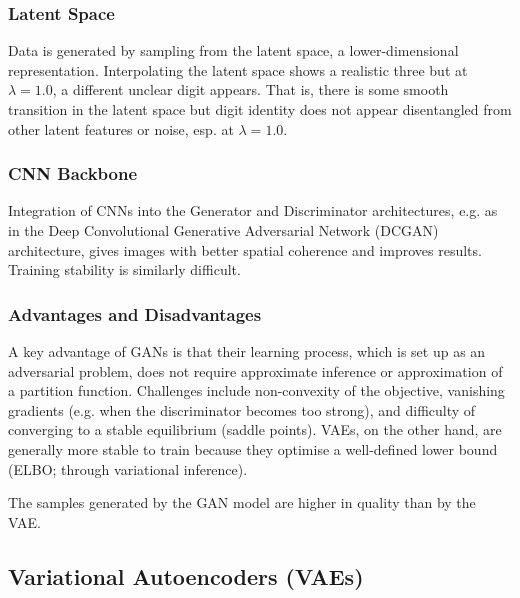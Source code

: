\vspace{-5pt}
\subsubsection{Latent Space}
\vspace{-5pt}

Data is generated by sampling from the latent space, a lower-dimensional representation.
Interpolating the latent space shows a realistic three but at $\lambda = 1.0$, a different unclear digit appears.
That is, there is some smooth transition in the latent space
but digit identity does not appear disentangled from other latent features or noise, esp. at $\lambda = 1.0$.

\vspace{-5pt}
\subsubsection{CNN Backbone}
\vspace{-5pt}

Integration of CNNs into the Generator and Discriminator architectures, e.g. as in the Deep Convolutional Generative Adversarial Network (DCGAN) architecture,
gives images with better spatial coherence and improves results. Training stability is similarly difficult.

\vspace{-5pt}
\subsubsection{Advantages and Disadvantages}
\vspace{-5pt}

A key advantage of GANs is that their learning process, which is set up as an adversarial problem, does not require approximate inference or approximation of a partition function.
Challenges include non-convexity of the objective, vanishing gradients (e.g. when the discriminator becomes too strong), and difficulty of converging to a stable equilibrium (saddle points).
VAEs, on the other hand, are generally more stable to train because they optimise a well-defined lower bound (ELBO; through variational inference).

The samples generated by the GAN model are higher in quality than by the VAE.

\subsection{Variational Autoencoders (VAEs)}

